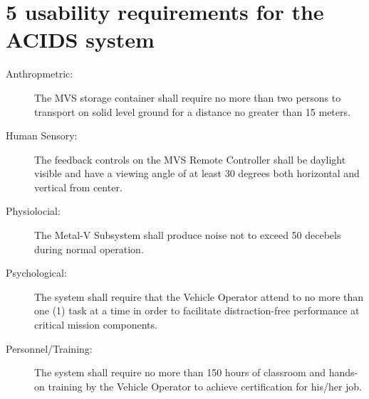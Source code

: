 \documentclass[letterpaper,10pt]{article}
\begin{document}
\section{5 usability requirements for the ACIDS system}
\begin {description} %
\item[Anthropmetric:] The MVS storage container shall require no more than two persons to transport on solid level ground for a distance no greater than 15 meters.
\item[Human Sensory:] The feedback controls on the MVS Remote Controller shall be daylight visible and have a viewing angle of at least 30 degrees both horizontal and vertical from center.
\item[Physiolocial:] The Metal-V Subsystem shall produce noise not to exceed 50 decebels during normal operation.
\item[Psychological:] The system shall require that the Vehicle Operator attend to no more than one (1) task at a time in order to facilitate distraction-free performance at critical mission components.
\item[Personnel/Training:] The system shall require no more than 150 hours of classroom and hands-on training by the Vehicle Operator to achieve certification for his/her job.
\end {description}
\end{document}
